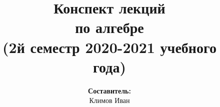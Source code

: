 \documentclass[../main.tex]{subfiles}
\begin{document}
\title{
    \bfseries
    {\Huge Конспект лекций \\ по алгебре}\\
    {\large (2й семестр 2020-2021 учебного года)}
}

\author{
    \textbf{Составитель:} \\ Климов Иван
}

\date{}

\maketitle
\end{document}
